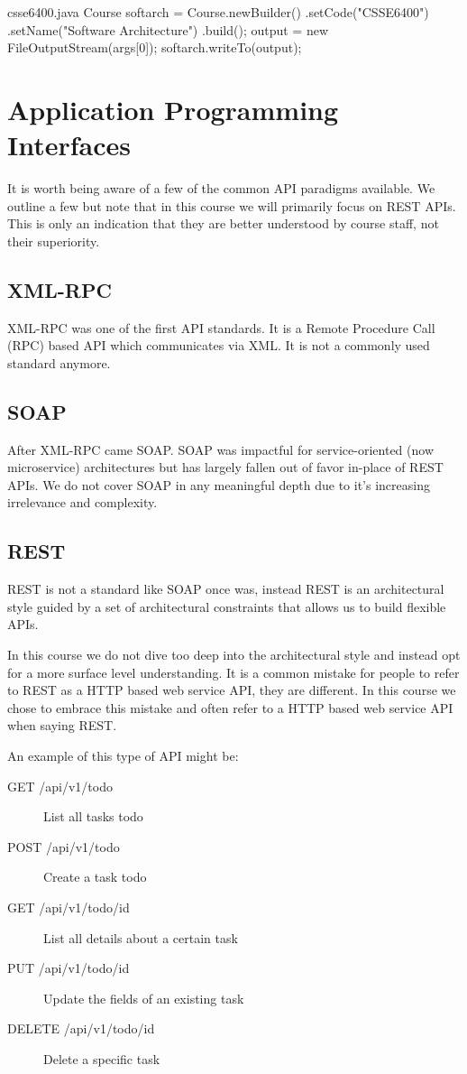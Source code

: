 \documentclass{csse4400}
\begin{document}
\begin{code}[language=java]{csse6400.java}
Course softarch = Course.newBuilder()
    .setCode("CSSE6400")
    .setName("Software Architecture")
    .build();
output = new FileOutputStream(args[0]);
softarch.writeTo(output);
\end{code}

\section{Application Programming Interfaces}
It is worth being aware of a few of the common API paradigms available.
We outline a few but note that in this course we will primarily focus on REST APIs.
This is only an indication that they are better understood by course staff,
not their superiority.

\subsection{XML-RPC}
XML-RPC was one of the first API standards.
It is a Remote Procedure Call (RPC) based API which communicates via XML.
It is not a commonly used standard anymore.

\subsection{SOAP}
After XML-RPC came SOAP.
SOAP was impactful for service-oriented (now microservice) architectures but has largely fallen out of favor in-place of REST APIs.
We do not cover SOAP in any meaningful depth due to it's increasing irrelevance and complexity.

\subsection{REST}
REST is not a standard like SOAP once was,
instead REST is an architectural style guided by a set of architectural constraints that allows us to build flexible APIs.

In this course we do not dive too deep into the architectural style and instead opt for a more surface level understanding.
It is a common mistake for people to refer to REST as a HTTP based web service API,
they are different.
In this course we chose to embrace this mistake and often refer to a HTTP based web service API when saying REST.

\noindent An example of this type of API might be:
\begin{description}
  \item[GET /api/v1/todo] List all tasks todo
  \item[POST /api/v1/todo] Create a task todo
  \item[GET /api/v1/todo/{id}] List all details about a certain task
  \item[PUT /api/v1/todo/{id}] Update the fields of an existing task
  \item[DELETE /api/v1/todo/{id}] Delete a specific task
\end{description}
\end{document}
